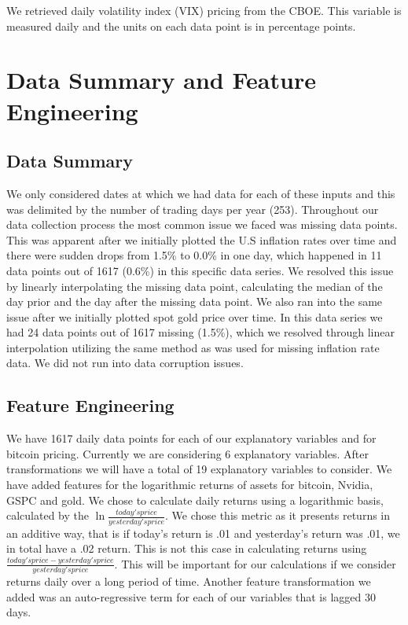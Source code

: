 \documentclass[9pt,twocolumn,twoside]{ilcss}
\begin{document}
We retrieved daily volatility index (VIX) pricing from the CBOE. This variable is measured daily and the units on each data point is in percentage points.  

\section{Data Summary and Feature Engineering}
\subsection*{Data Summary}
We only considered dates at which we had data for each of these inputs and this was delimited by the number of trading days per year (253). Throughout our data collection process the most common issue we faced was missing data points. This was apparent after we initially plotted the U.S inflation rates over time and there were sudden drops from 1.5\% to 0.0\% in one day, which happened in 11 data points out of 1617 (0.6\%) in this specific data series. We resolved this issue by linearly interpolating the missing data point, calculating the median of the day prior and the day after the missing data point. We also ran into the same issue after we initially plotted spot gold price over time. In this data series we had 24 data points out of 1617 missing (1.5\%), which we resolved through linear interpolation utilizing the same method as was used for missing inflation rate data. We did not run into data corruption issues.
\subsection*{Feature Engineering}
We have 1617 daily data points for each of our explanatory variables and for bitcoin pricing. Currently we are considering 6 explanatory variables. After transformations we will have a total of 19 explanatory variables to consider.
We have added features for the logarithmic returns of assets for bitcoin, Nvidia, GSPC and gold. We chose to calculate daily returns using a logarithmic basis, calculated by the $\ln{\frac{today's price}{yesterday's price}}$. We chose this metric as it presents returns in an additive way, that is if today's return is .01 and yesterday's return was .01, we in total have a .02 return. This is not this case in calculating returns using $\frac{today's price - yesterday's price}{yesterday's price}$. This will be important for our calculations if we consider returns daily over a long period of time. Another feature transformation we added was an auto-regressive term for each of our variables that is lagged 30 days. 
\end{document}
